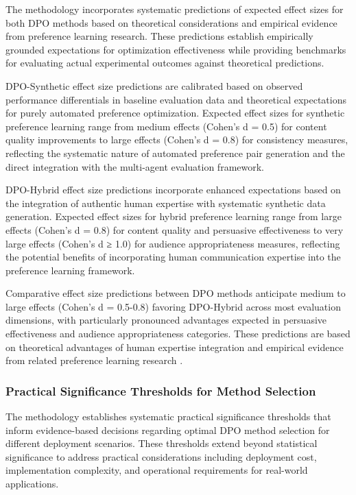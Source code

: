 The methodology incorporates systematic predictions of expected effect sizes for both DPO methods based on theoretical considerations and empirical evidence from preference learning research. These predictions establish empirically grounded expectations for optimization effectiveness while providing benchmarks for evaluating actual experimental outcomes against theoretical predictions.

DPO-Synthetic effect size predictions are calibrated based on observed performance differentials in baseline evaluation data and theoretical expectations for purely automated preference optimization. Expected effect sizes for synthetic preference learning range from medium effects (Cohen's d = 0.5) for content quality improvements to large effects (Cohen's d = 0.8) for consistency measures, reflecting the systematic nature of automated preference pair generation and the direct integration with the multi-agent evaluation framework.

DPO-Hybrid effect size predictions incorporate enhanced expectations based on the integration of authentic human expertise with systematic synthetic data generation. Expected effect sizes for hybrid preference learning range from large effects (Cohen's d = 0.8) for content quality and persuasive effectiveness to very large effects (Cohen's d ≥ 1.0) for audience appropriateness measures, reflecting the potential benefits of incorporating human communication expertise into the preference learning framework.

Comparative effect size predictions between DPO methods anticipate medium to large effects (Cohen's d = 0.5-0.8) favoring DPO-Hybrid across most evaluation dimensions, with particularly pronounced advantages expected in persuasive effectiveness and audience appropriateness categories. These predictions are based on theoretical advantages of human expertise integration and empirical evidence from related preference learning research \cite{poddar2024personalizing_rlhf, liu2024human_ai_teaming}.

\subsubsection{Practical Significance Thresholds for Method Selection}

The methodology establishes systematic practical significance thresholds that inform evidence-based decisions regarding optimal DPO method selection for different deployment scenarios. These thresholds extend beyond statistical significance to address practical considerations including deployment cost, implementation complexity, and operational requirements for real-world applications.

